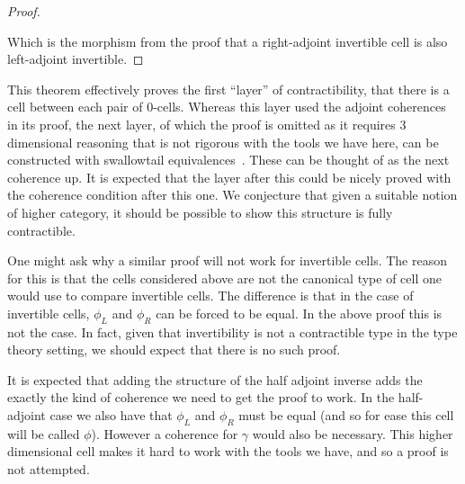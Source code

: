 \documentclass[draft]{article}
\begin{document}
\begin{proof}
\begin{center}
  \end{center}

  Which is the morphism from the proof that a right-adjoint invertible
  cell is also left-adjoint invertible.
\end{proof}

This theorem effectively proves the first ``layer'' of
contractibility, that there is a cell between each pair of
\(0\)-cells. Whereas this layer used the adjoint coherences in its
proof, the next layer, of which the proof is omitted as it requires 3
dimensional reasoning that is not rigorous with the tools we have
here, can be constructed with swallowtail
equivalences~\cite{nlab:lax_2-adjunction}. These can be thought of as
the next coherence up. It is expected that the layer after this could
be nicely proved with the coherence condition after this one. We
conjecture that given a suitable notion of higher category, it should
be possible to show this structure is fully contractible.

One might ask why a similar proof will not work for invertible cells.
The reason for this is that the cells considered above are not the
canonical type of cell one would use to compare invertible cells. The
difference is that in the case of invertible cells, \(\phi_L\) and
\(\phi_R\) can be forced to be equal. In the above proof this is not
the case. In fact, given that invertibility is not a contractible type
in the type theory setting, we should expect that there is no such
proof.

It is expected that adding the structure of the half adjoint inverse
adds the exactly the kind of coherence we need to get the proof to
work. In the half-adjoint case we also have that \(\phi_L\) and
\(\phi_R\) must be equal (and so for ease this cell will be called
\(\phi\)). However a coherence for \(\gamma\) would also be necessary.
This higher dimensional cell makes it hard to work with the tools we
have, and so a proof is not attempted.
\end{document}
